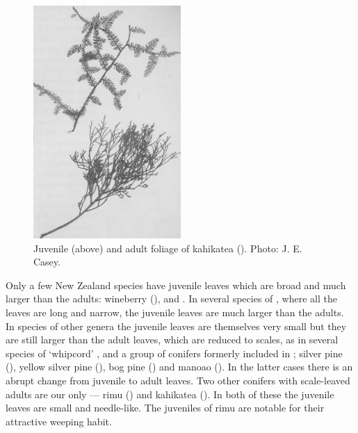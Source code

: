 \begin{figure}
	\includegraphics[width=0.5\textwidth]{graphics/figure22kahikatea.jpg}
	\centering
	\caption[Kahikatea foliage]{Juvenile (above) and adult foliage of kahikatea ().
	Photo: J. E. Casey.}
	\label{fig:22kahikatea}
\end{figure}

Only a few New Zealand species have juvenile leaves which are broad and much larger than the adults: wineberry (),  and .
In several species of , where all the leaves are long and narrow, the juvenile leaves are much larger than the adults.
In species of other genera the juvenile leaves are themselves very small but they are still larger than the adult leaves, which are reduced to scales, as in several species of `whipcord' ,  and a group of conifers formerly included in ; silver pine (), yellow silver pine (), bog pine ()  and manoao ().
In the latter cases there is an abrupt change from juvenile to adult leaves.
Two other conifers with scale-leaved adults are our only  — rimu () and kahikatea ().
In both of these the juvenile leaves are small and needle-like.
The juveniles of rimu are notable for their attractive weeping habit.

